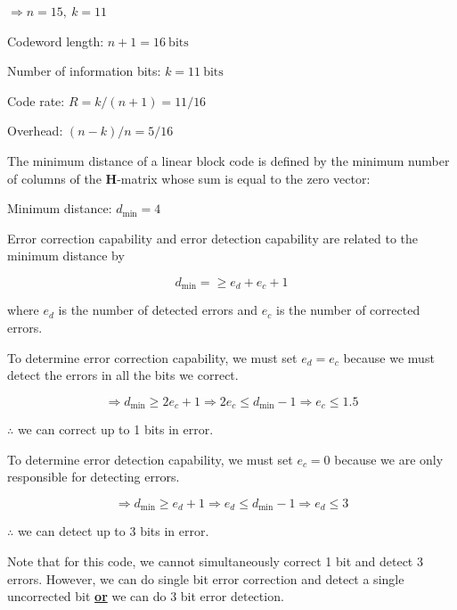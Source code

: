 \documentclass[fleqn]{article}
\begin{document}
\begin{enumerate}
\begin{enumerate}
			$\Rightarrow n = 15,\ k = 11$
						
			Codeword length: $n + 1 = 16\ \text{bits}$
			
			Number of information bits: $k = 11\ \text{bits}$
			
			Code rate: $R = k/(n+1) = 11/16$
			
			Overhead: $(n - k)/n = 5/16$
			
			The minimum distance of a linear block code is defined by the minimum number of columns of the $\mathbf{H}$-matrix whose sum is equal to the zero vector:
			
			Minimum distance: $d_\text{min} = 4$
			
			Error correction capability and error detection capability are related to the minimum distance by
			
			\begin{equation*}
				d_{\text{min}} = \geq e_d + e_c + 1
			\end{equation*}
			
			where $e_d$ is the number of detected errors and $e_c$ is the number of corrected errors.
			
			To determine error correction capability, we must set $e_d = e_c$ because we must detect the errors in all the bits we correct.
			
			\begin{equation*}
				\Rightarrow d_{\text{min}} \geq 2e_c + 1 \Rightarrow 2e_c \leq d_{\text{min}} - 1 \Rightarrow e_c \leq 1.5
			\end{equation*}
			
			$\therefore$ we can correct up to 1 bits in error.
			
			To determine error detection capability, we must set $e_c = 0$ because we are only responsible for detecting errors.
			
			\begin{equation*}
				\Rightarrow d_{\text{min}} \geq e_d + 1 \Rightarrow e_d \leq d_{\text{min}} - 1 \Rightarrow e_d \leq 3
			\end{equation*}
			
			$\therefore$ we can detect up to 3 bits in error.
			
			Note that for this code, we cannot simultaneously correct 1 bit and detect 3 errors. However, we can do single bit error correction and detect a single uncorrected bit \textbf{\underline{or}} we can do 3 bit error detection.
		\end{enumerate}
		

\end{enumerate}
\end{document}
